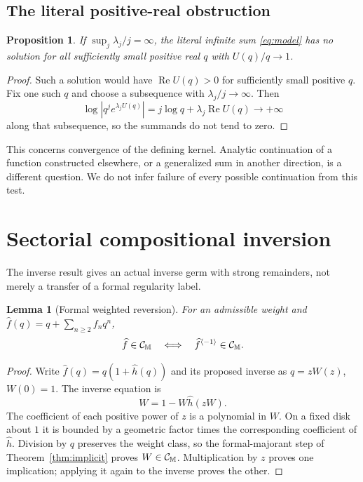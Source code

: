 \documentclass[11pt,a4paper]{article}
\numberwithin{equation}{section}
\newtheorem{proposition}[theorem]{Proposition}
\newtheorem{lemma}[theorem]{Lemma}
\theoremstyle{definition}\newtheorem{definition}[theorem]{Definition}
\theoremstyle{remark}\newtheorem{remark}[theorem]{Remark}
\DeclareMathOperator{\Rea}{Re}
\begin{document}
\subsection{The literal positive-real obstruction}
\begin{proposition}
\label{prop:positive}
If $\sup_j\lambda_j/j=\infty$, the literal infinite sum
\eqref{eq:model} has no solution for all sufficiently small positive
real $q$ with $U(q)/q\to1$.
\end{proposition}
\begin{proof}
Such a solution would have $\Rea U(q)>0$ for sufficiently small positive
$q$. Fix one such $q$ and choose a subsequence with
$\lambda_j/j\to\infty$. Then
\[
 \log|q^je^{\lambda_jU(q)}|=j\log q+\lambda_j\Rea U(q)
 \longrightarrow+\infty
\]
along that subsequence, so the summands do not tend to zero.
\end{proof}
This concerns convergence of the defining kernel. Analytic continuation
of a function constructed elsewhere, or a generalized sum in another
direction, is a different question. We do not infer failure of every
possible continuation from this test.

\section{Sectorial compositional inversion}
\label{sec:inverse}
The inverse result gives an actual inverse germ with strong remainders,
not merely a transfer of a formal regularity label.

\begin{lemma}[Formal weighted reversion]
\label{lem:formalreversion}
For an admissible weight and
$\widehat f(q)=q+\sum_{n\ge2}f_nq^n$,
\[
 \widehat f\in\mathcal C_{\mathbb M}\quad\Longleftrightarrow\quad
 \widehat f^{\langle-1\rangle}\in\mathcal C_{\mathbb M}.
\]
\end{lemma}
\begin{proof}
Write $\widehat f(q)=q(1+\widehat h(q))$ and its proposed inverse as
$q=zW(z)$, $W(0)=1$. The inverse equation is
\begin{equation}
 W=1-W\widehat h(zW).
 \label{eq:inverse-formal}
\end{equation}
The coefficient of each positive power of $z$ is a polynomial in $W$.
On a fixed disk about $1$ it is bounded by a geometric factor times the
corresponding coefficient of $\widehat h$. Division by $q$ preserves the
weight class, so the formal-majorant step of
Theorem~\ref{thm:implicit} proves $W\in\mathcal C_{\mathbb M}$. Multiplication by $z$
proves one implication; applying it again to the inverse proves the other.
\end{proof}
\end{document}
